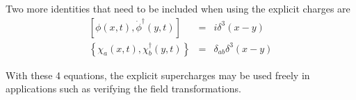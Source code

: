 Two more identities that need to be included when using the explicit charges are
\begin{eqnarray}
    \left[ \phi(x,t), \Dot{\phi}^\dagger(y,t)\right] &=& i \delta^3(x-y) \\
    \left\{ \chi_a(x,t) , \chi_b^\dagger(y,t)\right\} &=& \delta_{ab} \delta^3(x-y)
\end{eqnarray}

With these 4 equations, the explicit supercharges may be used freely in applications such as verifying the field transformations.
